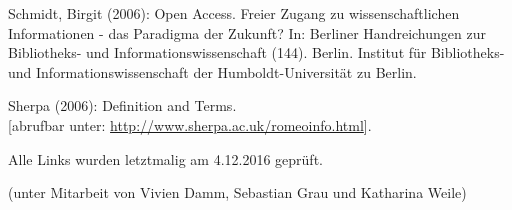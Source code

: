 \documentclass[a4paper,
fontsize=11pt,
oneside,
numbers=noperiodatend,
parskip=half-,
bibliography=totoc,
final
]{scrartcl}
\begin{document}
Schmidt, Birgit (2006): Open Access. Freier Zugang zu wissenschaftlichen
Informationen - das Paradigma der Zukunft? In: Berliner Handreichungen
zur Bibliotheks- und Informationswissenschaft (144). Berlin. Institut
für Bibliotheks- und Informationswissenschaft der Humboldt-Universität
zu Berlin.

Sherpa (2006): Definition and Terms.\\
{[}abrufbar unter: \url{http://www.sherpa.ac.uk/romeoinfo.html}{]}.

Alle Links wurden letztmalig am 4.12.2016 geprüft.

(unter Mitarbeit von Vivien Damm, Sebastian Grau und Katharina Weile)

\end{document}
